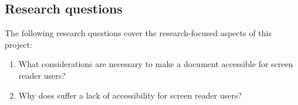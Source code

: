\subsection{Research questions}
The following research questions cover the research-focused aspects of this project:
\begin{enumerate}[label=\textbf{RQ\arabic*}]
    \item What considerations are necessary to make a \latexspaced document accessible for screen reader users?\label{rq:accessibility_considerations}
    \item Why does \latexspaced suffer a lack of accessibility for screen reader users?\label{rq:why_inaccessible}
\end{enumerate}